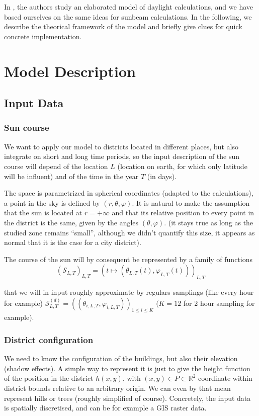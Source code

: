 \documentclass[english]{article}
\begin{document}
In \cite{miguet2002daylight}, the authors study an elaborated model
of daylight calculations, and we have based ourselves on the same
ideas for sunbeam calculations. In the following, we describe the
theorical framework of the model and briefly give clues for quick
concrete implementation.


\section*{Model Description}


\subsection*{Input Data}


\subsubsection*{Sun course}

We want to apply our model to districts located in different places,
but also integrate on short and long time periods, so the input description
of the sun course will depend of the location $L$ (location on earth,
for which only latitude will be influent) and of the time in the year
$T$ (in days).

The space is parametrized in spherical coordinates (adapted to the
calculations), a point in the sky is defined by $(r,\theta,\varphi)$.
It is natural to make the assumption that the sun is located at $r=+\infty$
and that its relative position to every point in the district is the
same, given by the angles $(\theta,\varphi)$. (it stays true as long
as the studied zone remains ``small'', although we didn't quantify
this size, it appears as normal that it is the case for a city district).

The course of the sun will by consequent be represented by a family
of functions
\[
(\mathcal{S}_{L,T})_{L,T}=(t\mapsto(\theta_{L,T}(t),\varphi_{L,T}(t)))_{L,T}
\]


that we will in input roughly approximate by regulars samplings (like
every hour for example) $\mathcal{S}_{L,T}^{(d)}=((\theta_{i,L,T},\varphi_{i,L,T}))_{1\leq i\leq K}$
($K=12$ for 2 hour sampling for example).


\subsubsection*{District configuration}

We need to know the configuration of the buildings, but also their
elevation (shadow effects). A simple way to represent it is just to
give the height function of the position in the district $h(x,y)$,
with $(x,y)\in P\subset\mathbb{R}^{2}$ coordinate within district
bounds relative to an arbitrary origin. We can even by that mean represent
hills or trees (roughly simplified of course). Concretely, the input
data is spatially discretised, and can be for example a GIS raster
data.
\end{document}
